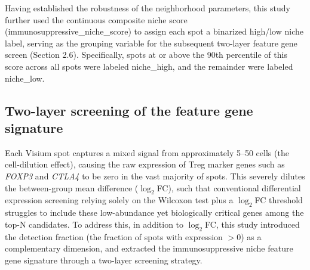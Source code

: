\documentclass[12pt, a4paper]{article}
\begin{document}
Having established the robustness of the neighborhood parameters, this study further used the continuous composite niche score (immunosuppressive\_niche\_score) to assign each spot a binarized high/low niche label, serving as the grouping variable for the subsequent two-layer feature gene screen (Section 2.6). Specifically, spots at or above the 90th percentile of this score across all spots were labeled niche\_high, and the remainder were labeled niche\_low.

\subsection{Two-layer screening of the feature gene signature}

Each Visium spot captures a mixed signal from approximately 5--50 cells (the cell-dilution effect), causing the raw expression of Treg marker genes such as \textit{FOXP3} and \textit{CTLA4} to be zero in the vast majority of spots. This severely dilutes the between-group mean difference ($\log_2$FC), such that conventional differential expression screening relying solely on the Wilcoxon test plus a $\log_2$FC threshold struggles to include these low-abundance yet biologically critical genes among the top-N candidates. To address this, in addition to $\log_2$FC, this study introduced the detection fraction (the fraction of spots with expression $>0$) as a complementary dimension, and extracted the immunosuppressive niche feature gene signature through a two-layer screening strategy.
\end{document}
